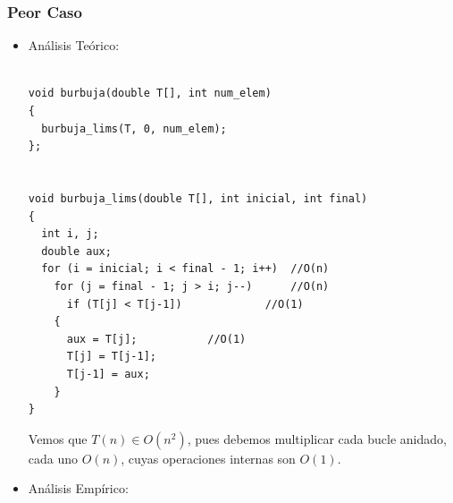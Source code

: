 \documentclass[a4paper,12pt,twoside]{article} %
\begin{document}
	\subsubsection{Peor Caso}
	\begin{itemize}
	
		\item Análisis Teórico:
		
	\lstset{language=C++}
	\begin{lstlisting}
	
void burbuja(double T[], int num_elem)
{
  burbuja_lims(T, 0, num_elem);
};


void burbuja_lims(double T[], int inicial, int final)
{
  int i, j;
  double aux;
  for (i = inicial; i < final - 1; i++)  //O(n)
    for (j = final - 1; j > i; j--)		 //O(n)
      if (T[j] < T[j-1])			 //O(1)
	{
	  aux = T[j];			//O(1)
	  T[j] = T[j-1];
	  T[j-1] = aux;
	}
}

	\end{lstlisting}
	
			Vemos que $T(n) \in O(n^2)$, pues debemos multiplicar cada bucle anidado, cada uno $O(n)$, cuyas operaciones internas son $O(1)$.

\newpage
		\item Análisis Empírico:
		

\end{itemize}
\end{document}
